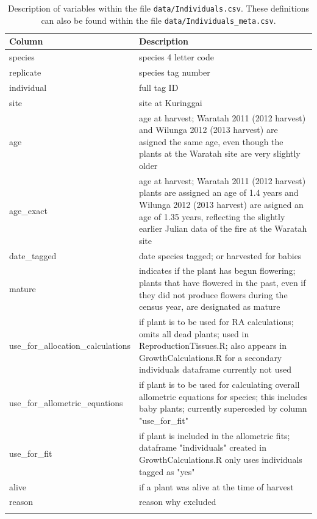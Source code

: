 \documentclass[10pt,twoside]{article}\usepackage[]{graphicx}\usepackage[]{color}
\begin{document}
\begingroup\small
\begin{longtable}{p{6cm}p{10cm}}
\caption{Description of variables within the file \texttt{data/Individuals.csv}. These definitions can also be found within the file \texttt{data/Individuals\_meta.csv}.} \\ 
  \hline
Column & Description \\ 
  \hline
species & species 4 letter code \\ 
  replicate & species tag number \\ 
  individual & full tag ID \\ 
  site & site at Kuringgai \\ 
  age & age at harvest; Waratah 2011 (2012 harvest) and Wilunga 2012 (2013 harvest) are asigned the same age, even though the  plants at the Waratah site are very slightly older \\ 
  age\_exact & age at harvest; Waratah 2011 (2012 harvest) plants are assigned an age of 1.4 years and Wilunga 2012 (2013 harvest) are asigned an age of 1.35 years, reflecting the slightly earlier Julian data of the fire at the Waratah site \\ 
  date\_tagged & date species tagged; or harvested for babies \\ 
  mature & indicates if the plant has begun flowering; plants that have flowered in the past, even if they did not produce flowers during the census year, are designated as mature \\ 
  use\_for\_allocation\_calculations & if plant is to be used for RA calculations; omits all dead plants; used in ReproductionTissues.R; also appears in GrowthCalculations.R for a secondary individuals dataframe currently not used \\ 
  use\_for\_allometric\_equations & if plant is to be used for calculating overall allometric equations for species; this includes baby plants; currently superceded by column "use\_for\_fit" \\ 
  use\_for\_fit & if plant is included in the allometric fits; dataframe "individuals" created in GrowthCalculations.R only uses individuals tagged as "yes"  \\ 
  alive & if a plant was alive at the time of harvest \\ 
  reason & reason why excluded \\ 
   \hline
\hline
\label{tab:Individuals_meta}
\end{longtable}
\endgroup
\end{document}
